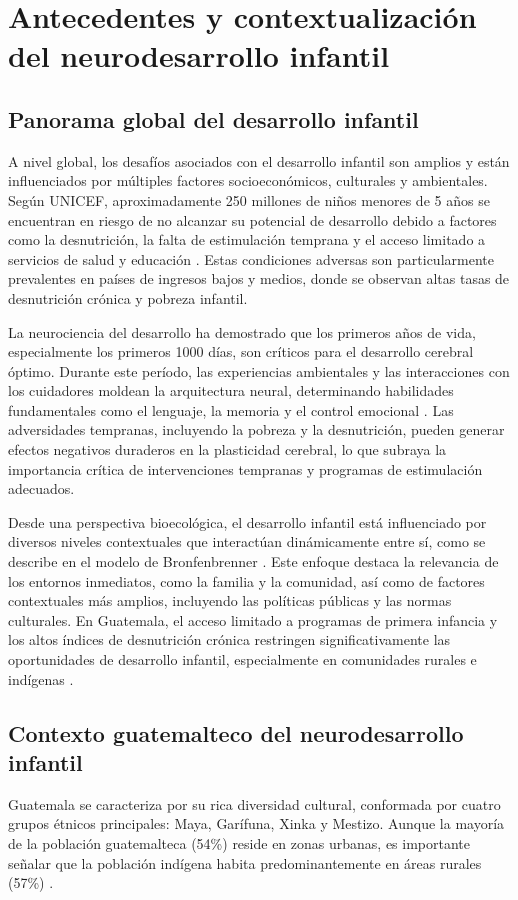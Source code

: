 \documentclass[11pt,letterpaper]{report}
\begin{document}
\section{Antecedentes y contextualización del neurodesarrollo infantil}
\subsection{Panorama global del desarrollo infantil}
A nivel global, los desafíos asociados con el desarrollo infantil son amplios 
y están influenciados por múltiples factores socioeconómicos, culturales y 
ambientales. Según UNICEF, aproximadamente 250 millones de niños menores de 5 
años se encuentran en riesgo de no alcanzar su potencial de desarrollo debido 
a factores como la desnutrición, la falta de estimulación temprana y el acceso 
limitado a servicios de salud y educación \cite{UNICEF2023}. Estas condiciones 
adversas son particularmente prevalentes en países de ingresos bajos y medios, 
donde se observan altas tasas de desnutrición crónica y pobreza infantil.

La neurociencia del desarrollo ha demostrado que los primeros años de vida, 
especialmente los primeros 1000 días, son críticos para el desarrollo cerebral 
óptimo. Durante este período, las experiencias ambientales y las interacciones 
con los cuidadores moldean la arquitectura neural, determinando habilidades 
fundamentales como el lenguaje, la memoria y el control emocional 
\cite{Stiles2010}. Las adversidades tempranas, incluyendo la pobreza y la 
desnutrición, pueden generar efectos negativos duraderos en la plasticidad 
cerebral, lo que subraya la importancia crítica de intervenciones tempranas y 
programas de estimulación adecuados.

Desde una perspectiva bioecológica, el desarrollo infantil está influenciado 
por diversos niveles contextuales que interactúan dinámicamente entre sí, como 
se describe en el modelo de Bronfenbrenner \cite{Bronfenbrenner2005}. Este 
enfoque destaca la relevancia de los entornos inmediatos, como la familia y la 
comunidad, así como de factores contextuales más amplios, incluyendo las 
políticas públicas y las normas culturales. En Guatemala, el acceso limitado a 
programas de primera infancia y los altos índices de desnutrición crónica 
restringen significativamente las oportunidades de desarrollo infantil, 
especialmente en comunidades rurales e indígenas \cite{SESAN2022}.

\subsection{Contexto guatemalteco del neurodesarrollo infantil}
Guatemala se caracteriza por su rica diversidad cultural, conformada por 
cuatro grupos étnicos principales: Maya, Garífuna, Xinka y Mestizo. Aunque la 
mayoría de la población guatemalteca (54\%) reside en zonas urbanas, es 
importante señalar que la población indígena habita predominantemente en áreas 
rurales (57\%) \cite{PoliticaInfanciaGuate}.
\end{document}
